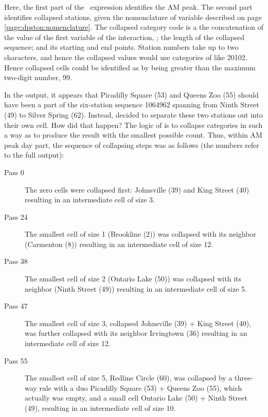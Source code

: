 Here, the first part of the \ifexp\ expression identifies
the AM peak. The second part identifies collapsed stations, given the nomenclature
of  variable described on page \ref{page:dpston:nomenclature}.
The collapsed category code is a the concatenation
of the value of the first variable of the interaction, ; the length of the collapsed sequence;
and its starting and end points. Station numbers take up to two characters, and hence the collapsed
values would use categories of  like 20102. Hence collapsed cells
could be identified as  by 
being greater than the maximum two-digit number, 99.

In the output, it appears that Picadilly Square (53) and Queens Zoo (55) should have been
a part of the six-station sequence 1064962 spanning from Ninth Street (49) to Silver Spring (62).
Instead,  decided to separate these two stations out into their own cell.
How did that happen? The logic of  is to collapse categories in such a way
as to produce the result with the smallest possible count. Thus, within AM peak day part,
the sequence of collapsing steps was as follows (the numbers refer to the full output):

\begin{description}
    \item[Pass 0] The zero cells were collapsed first: Johnsville (39) and King Street (40) resulting
        in an intermediate cell of size 3.
    \item[Pass 24] The smallest cell of size 1 (Brookline (2)) was collapsed with its neighbor
        (Carmenton (8)) resulting in an intermediate cell of size 12.
    \item[Pass 38] The smallest cell of size 2 (Ontario Lake (50)) was collapsed with its neighbor
        (Ninth Street (49)) resulting in an intermediate cell of size 5.
    \item[Pass 47] The smallest cell of size 3, collapsed Johnsville (39) + King Street (40),
        was further collapsed with its neighbor Irvingtown (36) resulting in an intermediate cell of size 12.
    \item[Pass 55] The smallest cell of size 5, Redline Circle (60), was collapsed by a three-way rule
        with a duo Picadilly Square (53) + Queens Zoo (55), which actually was empty, and a small cell
        Ontario Lake (50) + Ninth Street (49), resulting in an intermediate cell of size 10.
\end{description}

